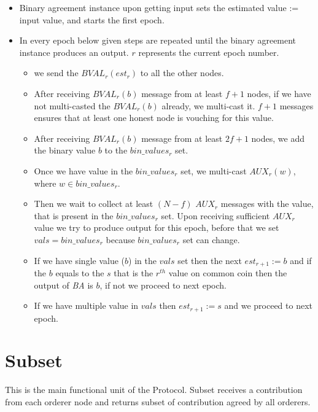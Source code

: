 \begin{itemize}
    \item Binary agreement instance upon getting input sets the estimated value := input value, and starts the first epoch.
    \item In every epoch below given steps are repeated until the binary agreement instance produces an output. $r$ represents the current epoch number.
    \begin{itemize}
        \item we send the $BVAL_{r}(est_{r})$ to all the other nodes.
        \item After receiving $BVAL_{r}(b)$ message from at least $f+1$ nodes, if we have not multi-casted the $BVAL_{r}(b)$ already, we multi-cast it. $f+1$ messages ensures that at least one honest node is vouching for this value.
        \item  After receiving $BVAL_{r}(b)$ message from at least $2f+1$ nodes,
        we add the binary value $b$ to the $bin\_values_r$ set.
        \item Once we have value in the $bin\_values_r$ set, we multi-cast $AUX_{r}(w)$, where $w \in bin\_values_{r}$.
        \item Then we wait to collect at least $(N-f)$ $AUX_{r}$ messages with the value, that is present in the $bin\_values_{r}$ set. Upon receiving sufficient $AUX_{r}$ value we try to produce output for this epoch, before that we set $vals = bin\_values_{r}$ because $bin\_values_{r}$ set can change. 
        \item If we have single value ($b$) in the $vals$ set then the next $est_{r+1} := b$ and if the $b$ equals to the $s$ that is the $r^{th}$ value on common coin then the output of \textit{BA} is $b$, if not we proceed to next epoch.
        \item If we have multiple value in $vals$ then $est_{r+1} := s$ and we proceed to next epoch. 
        \end{itemize}
\end{itemize}
\section{Subset}
This is the main functional unit of the Protocol. Subset receives a contribution from each orderer node and returns subset of contribution agreed by all orderers. 

